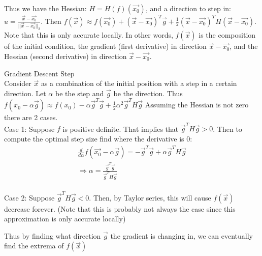 Thus we have the Hessian: $H=H(f)(\vec{x_0})$, and a direction to step in:  $\hat{u}=\frac{\vec{x}-\vec{x_0}}{||\vec{x}-\vec{x_0}||_2}$. Then $f(\vec{x})\approx f(\vec{x_0})+(\vec{x}-\vec{x_0})^T\vec{g}+\frac{1}{2}(\vec{x}-\vec{x_0})^TH(\vec{x}-\vec{x_0})$. Note that this is only accurate locally. In other words, $f(\vec{x})$ is the composition of the initial condition, the gradient (first derivative) in direction $\vec{x}-\vec{x_0}$, and the Hessian (second derivative) in direction $\vec{x}-\vec{x_0}$.

\begin{definition}
Gradient Descent Step\\
Consider $\vec{x}$ as a combination of the initial position with a step in a certain direction. Let $\alpha$ be the step and $\vec{g}$ be the direction.
Thus $f(x_0-\alpha\vec{g})\approx f(x_0)-\alpha \vec{g}^T\vec{g}+\frac{1}{2}\alpha^2\vec{g}^TH\vec{g}$ Assuming the Hessian is not zero there are 2 cases.\\
Case 1: Suppose $f$ is positive definite. That implies that $\vec{g}^TH\vec{g}>0$. Then to compute the optimal step size find where the derivative is 0:
\begin{align*}
    \frac{d}{d\alpha}f(\vec{x_0}-\alpha \vec{g})=-\vec{g}^T\vec{g}+\alpha\vec{g}^TH\vec{g}\\
    \Longrightarrow \alpha=\frac{\vec{g}^T\vec{g}}{\vec{g}^TH\vec{g}}
\end{align*}\\
Case 2: Suppose $\vec{g}^TH\vec{g}<0$. Then, by Taylor series, this will cause $f(\vec{x})$ decrease forever. (Note that this is probably not always the case since this approximation is only accurate locally)\\
\end{definition}

Thus by finding what direction $\vec{g}$ the gradient is changing in, we can eventually find the extrema of $f(\vec{x})$

